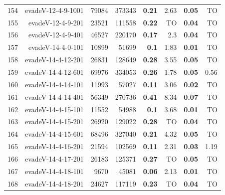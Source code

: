 \begin{longtable}{lrr@{\hskip 12pt}r@{\hskip 12pt}r@{\hskip 12pt}r@{\hskip 12pt}r@{\hskip 12pt}r}
154 & \multirow{1}{*}{evadeV-12-4-9-1001} & \multirow{1}{*}{79084} & \multirow{1}{*}{373343} & \textbf{0.21} & 2.63 & \textbf{0.05} & TO \\
155 & \multirow{1}{*}{evadeV-12-4-9-201} & \multirow{1}{*}{23521} & \multirow{1}{*}{111558} & \textbf{0.22} & TO & \textbf{0.04} & TO \\
156 & \multirow{1}{*}{evadeV-12-4-9-401} & \multirow{1}{*}{46527} & \multirow{1}{*}{220170} & \textbf{0.17} & 2.3 & \textbf{0.04} & TO \\
157 & \multirow{1}{*}{evadeV-14-4-0-101} & \multirow{1}{*}{10899} & \multirow{1}{*}{51699} & \textbf{0.1} & 1.83 & \textbf{0.01} & TO \\
158 & \multirow{1}{*}{evadeV-14-4-12-201} & \multirow{1}{*}{26831} & \multirow{1}{*}{128649} & \textbf{0.28} & 3.55 & \textbf{0.05} & TO \\
159 & \multirow{1}{*}{evadeV-14-4-12-601} & \multirow{1}{*}{69976} & \multirow{1}{*}{334053} & \textbf{0.26} & 1.78 & \textbf{0.05} & 0.56 \\
160 & \multirow{1}{*}{evadeV-14-4-14-101} & \multirow{1}{*}{11993} & \multirow{1}{*}{57027} & \textbf{0.11} & 3.06 & \textbf{0.02} & TO \\
161 & \multirow{1}{*}{evadeV-14-4-14-401} & \multirow{1}{*}{56349} & \multirow{1}{*}{270736} & \textbf{0.41} & 8.34 & \textbf{0.07} & TO \\
162 & \multirow{1}{*}{evadeV-14-4-15-101} & \multirow{1}{*}{11552} & \multirow{1}{*}{54988} & \textbf{0.1} & 3.68 & \textbf{0.01} & TO \\
163 & \multirow{1}{*}{evadeV-14-4-15-201} & \multirow{1}{*}{26920} & \multirow{1}{*}{129022} & \textbf{0.28} & TO & \textbf{0.04} & TO \\
164 & \multirow{1}{*}{evadeV-14-4-15-601} & \multirow{1}{*}{68496} & \multirow{1}{*}{327040} & \textbf{0.21} & 4.32 & \textbf{0.05} & TO \\
165 & \multirow{1}{*}{evadeV-14-4-16-201} & \multirow{1}{*}{21594} & \multirow{1}{*}{102569} & \textbf{0.11} & 2.31 & \textbf{0.03} & 1.19 \\
166 & \multirow{1}{*}{evadeV-14-4-17-201} & \multirow{1}{*}{26183} & \multirow{1}{*}{125371} & \textbf{0.27} & TO & \textbf{0.05} & TO \\
167 & \multirow{1}{*}{evadeV-14-4-18-101} & \multirow{1}{*}{9670} & \multirow{1}{*}{45081} & \textbf{0.06} & 2.13 & \textbf{0.01} & TO \\
168 & \multirow{1}{*}{evadeV-14-4-18-201} & \multirow{1}{*}{24627} & \multirow{1}{*}{117119} & \textbf{0.23} & TO & \textbf{0.04} & TO \\

\end{longtable}
